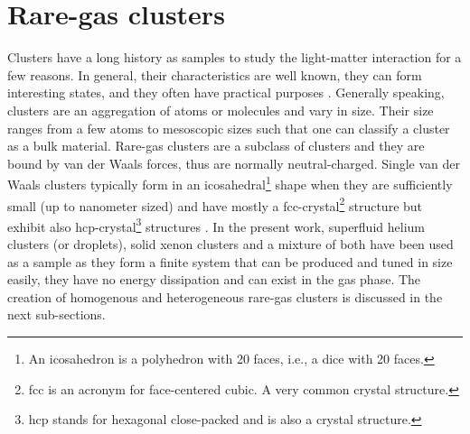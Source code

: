 \section{Rare-gas clusters}\label{sec:cluster-theory}
Clusters have a long history as samples to study the light-matter interaction for a few reasons. In general, their characteristics are well known, they can form interesting states, and they often have practical purposes \citep{Haberland-1994-Springer}. Generally speaking, clusters are an aggregation of atoms or molecules and vary in size. Their size ranges from a few atoms to mesoscopic sizes such that one can classify a cluster as a bulk material. Rare-gas clusters are a subclass of clusters and they are bound by van der Waals forces, thus are normally neutral-charged. Single van der Waals clusters typically form in an icosahedral\footnote{An icosahedron is a polyhedron with 20 faces, i.e., a dice with 20 faces.} shape when they are sufficiently small (up to nanometer sized) \citep{Miehle-1989-JCP} and have mostly a fcc-crystal\footnote{fcc is an acronym for face-centered cubic. A very common crystal structure.} structure but exhibit also hcp-crystal\footnote{hcp stands for hexagonal close-packed and is also a crystal structure.} structures \citep{VanDeWaal-1993-JCP,Krainyukova-2006-TSF}. In the present work, superfluid helium clusters (or droplets), solid xenon clusters and a mixture of both have been used as a sample as they form a finite system that can be produced and tuned in size easily, they have no energy dissipation and can exist in the gas phase. The creation of homogenous and heterogeneous rare-gas clusters is discussed in the next sub-sections.
%
%
%
